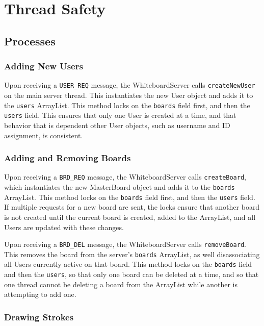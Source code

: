 \section{Thread Safety}

\subsection{Processes}

\subsubsection{Adding New Users}

Upon receiving a \texttt{USER\_REQ} message, the WhiteboardServer calls \texttt{createNewUser} on the main server thread. This instantiates the new User object and adds it to the \texttt{users} ArrayList. This method locks on the \texttt{boards} field first, and then the \texttt{users} field. This ensures that only one User is created at a time, and that behavior that is dependent other User objects, such as username and ID assignment, is consistent.

\subsubsection{Adding and Removing Boards}

Upon receiving a \texttt{BRD\_REQ} message, the WhiteboardServer calls \texttt{createBoard}, which instantiates the new MasterBoard object and adds it to the \texttt{boards} ArrayList. This method locks on the \texttt{boards} field first, and then the \texttt{users} field. If multiple requests for a new board are sent, the locks ensure that another board is not created until the current board is created, added to the ArrayList, and all Users are updated with these changes.

Upon receiving a \texttt{BRD\_DEL} message, the WhiteboardServer calls \texttt{removeBoard}. This removes the board from the server's \texttt{boards} ArrayList, as well disassociating all Users currently active on that board. This method locks on the \texttt{boards} field and then the \texttt{users}, so that only one board can be deleted at a time, and so that one thread cannot be deleting a board from the ArrayList while another is attempting to add one.

\subsubsection{Drawing Strokes}

